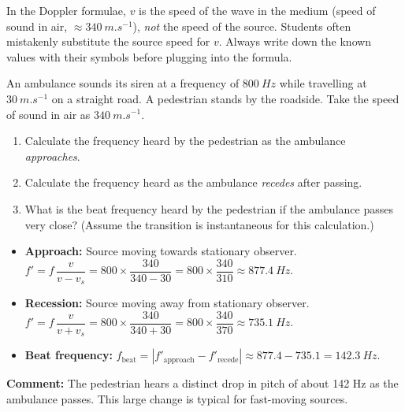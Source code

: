 \documentclass[11pt]{article}
\newcommand{\cle}[1]{{\popxbold\color{popdark}#1}}
\begin{document}
\begin{attention}
In the Doppler formulae, \cle{$v$ is the speed of the wave in the medium} (speed of sound in air, $\approx \SI{340}{m.s^{-1}}$), \emph{not} the speed of the source. Students often mistakenly substitute the source speed for $v$. Always write down the known values with their symbols before plugging into the formula.
\end{attention}

\begin{exoresolu}
An ambulance sounds its siren at a frequency of $\SI{800}{Hz}$ while travelling at $\SI{30}{m.s^{-1}}$ on a straight road. A pedestrian stands by the roadside. Take the speed of sound in air as $\SI{340}{m.s^{-1}}$.
\begin{enumerate}
\item Calculate the frequency heard by the pedestrian as the ambulance \emph{approaches}.
\item Calculate the frequency heard as the ambulance \emph{recedes} after passing.
\item What is the beat frequency heard by the pedestrian if the ambulance passes very close? (Assume the transition is instantaneous for this calculation.)
\end{enumerate}
\tcblower
\begin{itemize}
\item \textbf{Approach:} Source moving towards stationary observer. $f' = f\,\dfrac{v}{v - v_s} = 800 \times \dfrac{340}{340 - 30} = 800 \times \dfrac{340}{310} \approx \SI{877.4}{Hz}$.
\item \textbf{Recession:} Source moving away from stationary observer. $f' = f\,\dfrac{v}{v + v_s} = 800 \times \dfrac{340}{340 + 30} = 800 \times \dfrac{340}{370} \approx \SI{735.1}{Hz}$.
\item \textbf{Beat frequency:} $f_{\text{beat}} = |f'_{\text{approach}} - f'_{\text{recede}}| \approx 877.4 - 735.1 = \SI{142.3}{Hz}$.
\end{itemize}
\textbf{Comment:} The pedestrian hears a distinct drop in pitch of about 142 Hz as the ambulance passes. This large change is typical for fast-moving sources.
\end{exoresolu}
\end{document}
